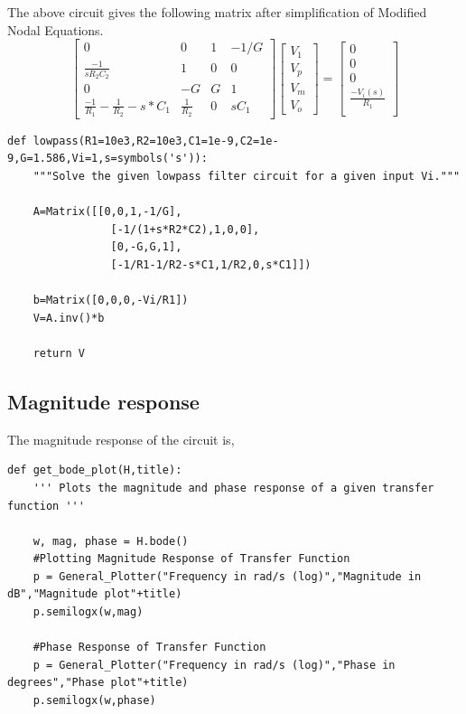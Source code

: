 \documentclass{article}
\begin{document}
\noindent
The above circuit gives the following matrix after simplification of Modified Nodal Equations.
\\
\begin{equation*}
    \begin{bmatrix}
    0   & 0 & 1  & -1/G \\
    \frac{-1}{sR_2C_2}  & 1 & 0 & 0\\
    0  & -G & G & 1 \\
    \frac{-1}{R_1} - \frac{1}{R_2} - s*C_1 & \frac{1}{R_2} & 0 & sC_1
\end{bmatrix}
\begin{bmatrix}
    V_1\\
    V_p\\
    V_m \\
    V_o
\end{bmatrix}
=
\begin{bmatrix}
    0 \\
    0 \\
    0 \\
    \frac{-V_i(s)}{R_1} \\
\end{bmatrix}
\end{equation*}

\begin{lstlisting}
def lowpass(R1=10e3,R2=10e3,C1=1e-9,C2=1e-9,G=1.586,Vi=1,s=symbols('s')):
    """Solve the given lowpass filter circuit for a given input Vi."""

    A=Matrix([[0,0,1,-1/G],
                [-1/(1+s*R2*C2),1,0,0],
                [0,-G,G,1],
                [-1/R1-1/R2-s*C1,1/R2,0,s*C1]])

    b=Matrix([0,0,0,-Vi/R1])    
    V=A.inv()*b

    return V
\end{lstlisting}

\subsection*{Magnitude response}
The magnitude response of the circuit is,
\newpage
\begin{lstlisting}
def get_bode_plot(H,title):
    ''' Plots the magnitude and phase response of a given transfer function '''

    w, mag, phase = H.bode()
    #Plotting Magnitude Response of Transfer Function 
    p = General_Plotter("Frequency in rad/s (log)","Magnitude in dB","Magnitude plot"+title)
    p.semilogx(w,mag)
    
    #Phase Response of Transfer Function
    p = General_Plotter("Frequency in rad/s (log)","Phase in degrees","Phase plot"+title)
    p.semilogx(w,phase)
\end{lstlisting}
\end{document}
